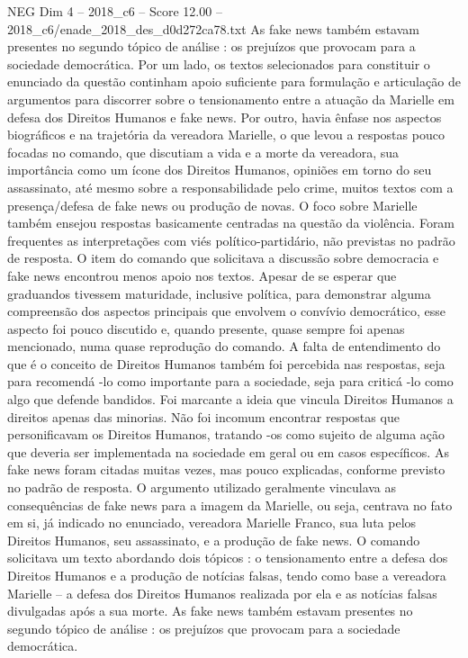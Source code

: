 \begin{textsample}{NEG Dim 4 – 2018\_c6 – Score 12.00 – 2018\_c6/enade\_2018\_des\_d0d272ca78.txt}
As fake news também estavam presentes no segundo tópico de análise : os prejuízos que provocam para a sociedade democrática.
Por um lado, os textos selecionados para constituir o enunciado da questão continham apoio suficiente para formulação e articulação de argumentos para discorrer sobre o tensionamento entre a atuação da Marielle em defesa dos Direitos Humanos e fake news.
Por outro, havia ênfase nos aspectos biográficos e na trajetória da vereadora Marielle, o que levou a respostas pouco focadas no comando, que discutiam a vida e a morte da vereadora, sua importância como um ícone dos Direitos Humanos, opiniões em torno do seu assassinato, até mesmo sobre a responsabilidade pelo crime, muitos textos com a presença/defesa de fake news ou produção de novas.
O foco sobre Marielle também ensejou respostas basicamente centradas na questão da violência.
Foram frequentes as interpretações com viés político-partidário, não previstas no padrão de resposta.
O item do comando que solicitava a discussão sobre democracia e fake news encontrou menos apoio nos textos.
Apesar de se esperar que graduandos tivessem maturidade, inclusive política, para demonstrar alguma compreensão dos aspectos principais que envolvem o convívio democrático, esse aspecto foi pouco discutido e, quando presente, quase sempre foi apenas mencionado, numa quase reprodução do comando.
A falta de entendimento do que é o conceito de Direitos Humanos também foi percebida nas respostas, seja para recomendá -lo como importante para a sociedade, seja para criticá -lo como algo que defende bandidos.
Foi marcante a ideia que vincula Direitos Humanos a direitos apenas das minorias.
Não foi incomum encontrar respostas que personificavam os Direitos Humanos, tratando -os como sujeito de alguma ação que deveria ser implementada na sociedade em geral ou em casos específicos.
As fake news foram citadas muitas vezes, mas pouco explicadas, conforme previsto no padrão de resposta.
O argumento utilizado geralmente vinculava as consequências de fake news para a imagem da Marielle, ou seja, centrava no fato em si, já indicado no enunciado, vereadora Marielle Franco, sua luta pelos Direitos Humanos, seu assassinato, e a produção de fake news.
O comando solicitava um texto abordando dois tópicos : o tensionamento entre a defesa dos Direitos Humanos e a produção de notícias falsas, tendo como base a vereadora Marielle – a defesa dos Direitos Humanos realizada por ela e as notícias falsas divulgadas após a sua morte.
As fake news também estavam presentes no segundo tópico de análise : os prejuízos que provocam para a sociedade democrática.

\end{textsample}
